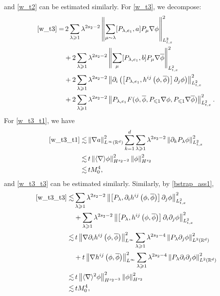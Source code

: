 \documentclass[10pt,twoside,a4paper]{article}
\numberwithin{equation}{section}\allowdisplaybreaks
\def\leq{\leqslant}
\def\geq{\geqslant}
\begin{document}
	and \eqref{w_t2} can be estimated similarly.  For \eqref{w_t3}, we decompose:
	\begin{align}
		\eqref{w_t3} = 	&\,2\sum_{\lambda \geq 1} \lambda^{ 2s_2-2}
		\left\| \sum_{\mu\sim \lambda} [  P_{\lambda, e_1},a  ]  P_\mu \nabla \phi\right\|_{L^2_{t,x}}^2\label{w_t3_t1}\\
		&+2\sum_{\lambda \geq 1} \lambda^{ 2s_2-2}	\left\|  \sum_{\mu}  [P_{\lambda, e_1},b ]  P_\mu \nabla\overline{ \phi } \right\|_{L^2_{t,x}}^2 \label{w_t3_t2}\\
		&+2\sum_{\lambda \geq 1} \lambda^{ 2s_2-2}	\left\|  \partial_i\left(\left[P_{\lambda, e_1}, h^{ij}\left(\phi,\overline{\phi}\right) \right]  \partial_j  \phi \right)  \right\|_{L^2_{t,x}}^2
		\label{w_t3_t3}\\
		&+ 2\sum_{\lambda \geq 1} \lambda^{ 2s_2-2} \left\| P_{\lambda, e_1}  F(\phi, \overline{\phi}, P_{\leq 1} \nabla \phi,  P_{\leq 1} \nabla \overline{\phi})\right\|_{L^2_{t,x}}^2.
		\label{w_t3_t4}
	\end{align}
	For \eqref{w_t3_t1}, we have
	\begin{align*}
		\eqref{w_t3_t1} \lesssim &  \left\|  \nabla a \right\|_{L^{\infty}(\mathbb{R}^d)}^2   \sum_{k=1}^d\sum_{\lambda \geq 1} \lambda^{ 2s_2-2} \left\|  \partial_k  P_\lambda \phi   \right\|_{L^2_{t,x}}^2 \\
		\lesssim &  \,  t \left\|  \langle \nabla \rangle  \phi \right\|_{H^{s_2-2}}^2   \left\|  \phi \right\|_{H^ {s_2}}^2 \\
		\lesssim &\,   t M_0^4,
	\end{align*}
	and 	\eqref{w_t3_t3} can be estimated similarly. Similarly, by \eqref{bstrap_ass1}, 
	\begin{align*}
		\eqref{w_t3_t3} \lesssim &    \sum_{\lambda \geq 1} \lambda^{ 2s_2-2}  \left\|  \left[P_{\lambda },\partial_i h^{ij}\left(\phi,\overline{\phi}\right) \right]  \partial_j  \phi  \right\|_{L^2_{t,x}}^2\\
		&+\sum_{\lambda \geq 1} \lambda^{ 2s_2-2}  \left\| \left[P_{\lambda },h^{ij}\left(\phi,\overline{\phi}\right) \right] \partial_i  \partial_j  \phi  \right\|_{L^2_{t,x}}^2\\
		\lesssim&\, t  \left\|   \nabla \partial_i h^{ij}\left(\phi,\overline{\phi}\right) \right\|_{L^\infty}^2  \sum_{\lambda \geq 1} \lambda^{ 2s_2-4}\left\|  P_\lambda  \partial_j \phi \right\|_{L^2 (\mathbb{R}^d)}^2 \\
		&+ t  \left\|   \nabla  h^{ij}\left(\phi,\overline{\phi}\right) \right\|_{L^\infty}^2  \sum_{\lambda \geq 1} \lambda^{ 2s_2-4}\left\|  P_\lambda \partial_i    \partial_j \phi \right\|_{L^2 (\mathbb{R}^d)}^2 \\
		\lesssim &\,	t  \left\| \langle \nabla \rangle^2 \phi \right\|_{H^{s_2-3}}^2 \left\|\phi \right\|_{H^{s_2}}^2  \\
		\lesssim&\,    t M_0^4,
	\end{align*}
\end{document}
